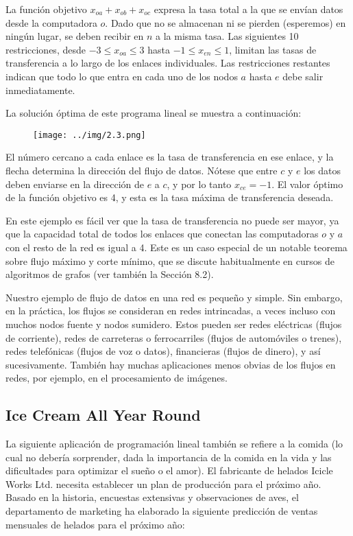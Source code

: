 \documentclass{article}
\begin{document}
La función objetivo \(x_{oa} + x_{ob} + x_{oc}\) expresa la tasa total a la que se envían datos desde la computadora \(o\). Dado que no se almacenan ni se pierden (esperemos) en ningún lugar, se deben recibir en \(n\) a la misma tasa. Las siguientes 10 restricciones, desde \(-3 \leq x_{oa} \leq 3\) hasta \(-1 \leq x_{en} \leq 1\), limitan las tasas de transferencia a lo largo de los enlaces individuales. Las restricciones restantes indican que todo lo que entra en cada uno de los nodos \(a\) hasta \(e\) debe salir inmediatamente.

La solución óptima de este programa lineal se muestra a continuación: 


\begin{figure}[H] %
\centering %
\texttt{[image: ../img/2.3.png]} %
\label{fig:imagen} %
\end{figure}


El número cercano a cada enlace es la tasa de transferencia en ese enlace, y la flecha determina la dirección del flujo de datos. Nótese que entre \(c\) y \(e\) los datos deben enviarse en la dirección de \(e\) a \(c\), y por lo tanto \(x_{ce} = -1\). El valor óptimo de la función objetivo es 4, y esta es la tasa máxima de transferencia deseada.

En este ejemplo es fácil ver que la tasa de transferencia no puede ser mayor, ya que la capacidad total de todos los enlaces que conectan las computadoras \(o\) y \(a\) con el resto de la red es igual a 4. Este es un caso especial de un notable teorema sobre flujo máximo y corte mínimo, que se discute habitualmente en cursos de algoritmos de grafos (ver también la Sección 8.2).

Nuestro ejemplo de flujo de datos en una red es pequeño y simple. Sin embargo, en la práctica, los flujos se consideran en redes intrincadas, a veces incluso con muchos nodos fuente y nodos sumidero. Estos pueden ser redes eléctricas (flujos de corriente), redes de carreteras o ferrocarriles (flujos de automóviles o trenes), redes telefónicas (flujos de voz o datos), financieras (flujos de dinero), y así sucesivamente. También hay muchas aplicaciones menos obvias de los flujos en redes, por ejemplo, en el procesamiento de imágenes.



\newpage 

\subsection{Ice Cream All Year Round}
La siguiente aplicación de programación lineal también se refiere a la comida (lo cual no debería sorprender, dada la importancia de la comida en la vida y las dificultades para optimizar el sueño o el amor). El fabricante de helados Icicle Works Ltd. necesita establecer un plan de producción para el próximo año. Basado en la historia, encuestas extensivas y observaciones de aves, el departamento de marketing ha elaborado la siguiente predicción de ventas mensuales de helados para el próximo año:
\end{document}

